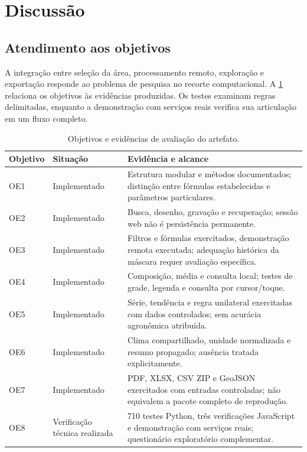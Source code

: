 \newpage
\section{Discussão}\label{chap:discussao-final}

\subsection{Atendimento aos objetivos}

A integração entre seleção da área, processamento remoto, exploração e exportação responde ao problema de pesquisa no recorte computacional. A \cref{tab:objetivos-final} relaciona os objetivos às evidências produzidas. Os testes examinam regras delimitadas, enquanto a demonstração com serviços reais verifica sua articulação em um fluxo completo.

\begin{table}[htbp]
\centering\small
\caption{Objetivos e evidências de avaliação do artefato.}
\label{tab:objetivos-final}
\begin{tabular}{p{}p{}p{}}
\hline
\textbf{Objetivo} & \textbf{Situação} & \textbf{Evidência e alcance} \\ \hline
OE1 & Implementado & Estrutura modular e métodos documentados; distinção entre fórmulas estabelecidas e parâmetros particulares. \\
OE2 & Implementado & Busca, desenho, gravação e recuperação; sessão web não é persistência permanente. \\
OE3 & Implementado & Filtros e fórmulas exercitados, demonstração remota executada; adequação histórica da máscara requer avaliação específica. \\
OE4 & Implementado & Composição, média e consulta local; testes de grade, legenda e consulta por cursor/toque. \\
OE5 & Implementado & Série, tendência e regra unilateral exercitadas com dados controlados; sem acurácia agronômica atribuída. \\
OE6 & Implementado & Clima compartilhado, unidade normalizada e resumo propagado; ausência tratada explicitamente. \\
OE7 & Implementado & PDF, XLSX, CSV ZIP e GeoJSON exercitados com entradas controladas; não equivalem a pacote completo de reprodução. \\
OE8 & Verificação técnica realizada & 710 testes Python, três verificações JavaScript e demonstração com serviços reais; questionário exploratório complementar. \\ \hline
\end{tabular}
\end{table}

